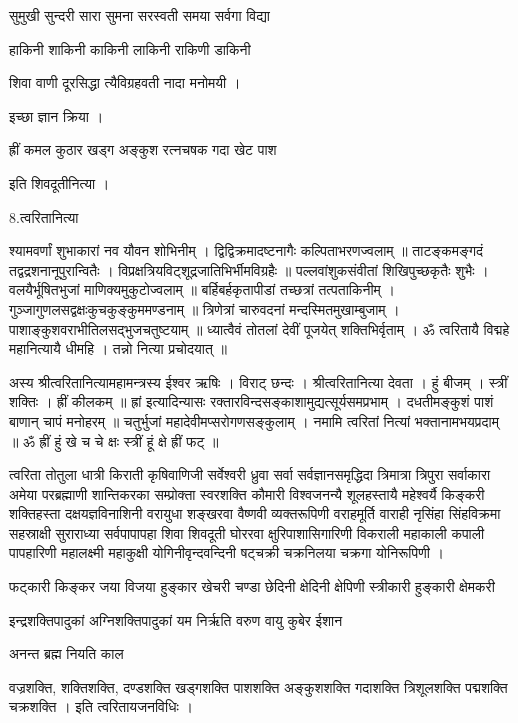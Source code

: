 सुमुखी सुन्दरी सारा सुमना सरस्वती समया सर्वगा विद्या 

हाकिनी शाकिनी काकिनी लाकिनी राकिणी डाकिनी 

शिवा वाणी दूरसिद्धा त्यैविग्रहवती नादा मनोमयी ।

इच्छा ज्ञान क्रिया ।

ह्रीं कमल कुठार खड्ग अङ्कुश रत्नचषक गदा खेट पाश


इति शिवदूतीनित्या ।




8.त्वरितानित्या

श्यामवर्णां शुभाकारां नव यौवन शोभिनीम् । द्विद्विक्रमादष्टनागैः कल्पिताभरणज्वलाम् ॥
ताटङ्कमङ्गदं तद्वद्रशनानूपुरान्वितैः । विप्रक्षत्रियविट्शूद्रजातिभिर्भीमविग्रहैः ॥
पल्लवांशुकसंवीतां शिखिपुच्छकृतैः शुभैः । वलयैर्भूषितभुजां माणिक्यमुकुटोज्वलाम् ॥
बर्हिबर्हकृतापीडां तच्छत्रां तत्पताकिनीम् । गुञ्जागुणलसद्वक्षःकुचकुङ्कुममण्डनाम् ॥
त्रिणेत्रां चारुवदनां मन्दस्मितमुखाम्बुजाम् । पाशाङ्कुशवराभीतिलसद्भुजचतुष्टयाम् ॥
ध्यात्वैवं तोतलां देवीं पूजयेत् शक्तिभिर्वृताम् । 
ॐ त्वरितायै विद्महे महानित्यायै धीमहि । तन्नो नित्या प्रचोदयात् ॥


अस्य श्रीत्वरितानित्यामहामन्त्रस्य ईश्वर ऋषिः । विराट्  छन्दः । श्रीत्वरितानित्या देवता । हुं बीजम् । स्त्रीं शक्तिः । ह्रीं कीलकम् ॥
ह्रां इत्यादिन्यासः
रक्तारविन्दसङ्काशामुद्यत्सूर्यसमप्रभाम् । दधतीमङ्कुशं पाशं बाणान् चापं मनोहरम् ॥
चतुर्भुजां महादेवीमप्सरोगणसङ्कुलाम् । नमामि त्वरितां नित्यां भक्तानामभयप्रदाम् ॥
ॐ ह्रीं हुं खे च चे क्षः स्त्रीं हूं क्षे ह्रीं फट् ॥

त्वरिता तोतुला धात्री किराती कृषिवाणिजी सर्वेश्वरी ध्रुवा सर्वा सर्वज्ञानसमृद्धिदा त्रिमात्रा त्रिपुरा सर्वाकारा अमेया परब्रह्माणी शान्तिकरका सम्प्रोक्ता स्वरशक्ति कौमारी विश्वजनन्यै शूलहस्तायै महेश्वर्यै किङ्करी शक्तिहस्ता दक्षयज्ञविनाशिनी वरायुधा शङ्खरवा वैष्णवी व्यक्तरूपिणी वराहमूर्ति वाराही नृसिंहा सिंहविक्रमा सहस्राक्षी सुराराध्या सर्वपापापहा शिवा शिवदूती घोररवा क्षुरिपाशासिगारिणी विकराली महाकाली कपाली पापहारिणी महालक्ष्मी महाकुक्षी योगिनीवृन्दवन्दिनी षट्चक्री चक्रनिलया चक्रगा योनिरूपिणी ।

फट्कारी किङ्कर जया विजया हुङ्कार खेचरी चण्डा छेदिनी क्षेदिनी क्षेपिणी स्त्रीकारी हुङ्कारी क्षेमकरी 

इन्द्रशक्तिपादुकां अग्निशक्तिपादुकां यम निर्ऋति वरुण वायु कुबेर ईशान 								

अनन्त ब्रह्म नियति काल 				
																		
वज्रशक्ति, शक्तिशक्ति, दण्डशक्ति खड्गशक्ति पाशशक्ति अङ्कुशशक्ति गदाशक्ति त्रिशूलशक्ति पद्मशक्ति चक्रशक्ति ।
इति त्वरितायजनविधिः ।

